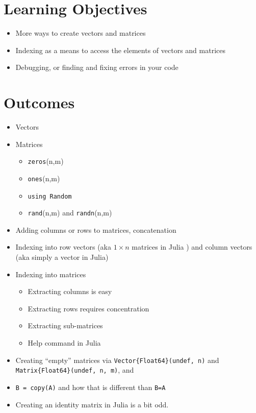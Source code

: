 


\section*{Learning Objectives}

\begin{itemize}
\item  More ways to create vectors and matrices
\item  Indexing as a means to access the elements of vectors and matrices
\item Debugging, or finding and fixing errors in your code
\end{itemize}

\section*{Outcomes} 
\begin{itemize}
\item Vectors
\item Matrices
\begin{itemize}
\item \texttt{zeros}(n,m)
\item \texttt{ones}(n,m)
\item \texttt{using Random}
\item  \texttt{rand}(n,m) and \texttt{randn}(n,m)
    \end{itemize}
\item Adding columns or rows to matrices, concatenation
\item Indexing into row vectors (aka $1 \times n$ matrices in Julia ) and column vectors (aka simply a vector in Julia)
\item Indexing into matrices
\begin{itemize}
\item Extracting columns is easy
\item Extracting rows requires concentration
\item Extracting sub-matrices
\item Help command in Julia
    \end{itemize}
    \item Creating ``empty'' matrices via \texttt{Vector\{Float64\}(undef, n)} and  \texttt{Matrix\{Float64\}(undef, n, m)}, and 
    \item \texttt{B = copy(A)} and how that is different than \texttt{B=A}
    \item Creating an identity matrix in Julia is a bit odd.
\end{itemize}

